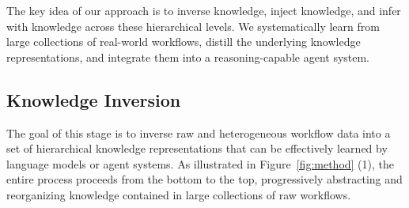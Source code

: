 \documentclass[runningheads]{llncs}
\begin{document}
The key idea of our approach is to inverse knowledge, inject knowledge, and infer with knowledge across these hierarchical levels.
%
We systematically learn from large collections of real-world workflows, distill the underlying knowledge representations, and integrate them into a reasoning-capable agent system. 


\subsection{Knowledge Inversion}
%
The goal of this stage is to inverse raw and heterogeneous workflow data into a set of hierarchical knowledge representations that can be effectively learned by language models or agent systems.
%
As illustrated in Figure~\ref{fig:method} (1), the entire process proceeds from the bottom to the top, progressively abstracting and reorganizing knowledge contained in large collections of raw workflows.
\end{document}
